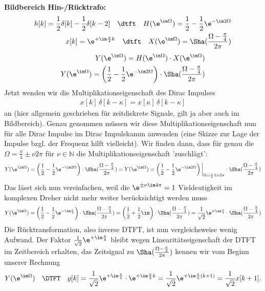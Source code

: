 \begin{ExCalc}
\textbf{Bildbereich Hin-/Rücktrafo:}
\begin{align}
h[k] = \frac{1}{2}\delta[k] - \frac{1}{2}\delta[k-2]\quad\dtft\quad
H(\e^{\im\Omega}) = \frac{1}{2} - \frac{1}{2} \e^{-\im 2 \Omega}\\
x[k]=\e^{+\im \frac{\pi}{4} k} \quad\dtft\quad
X(\e^{\im\Omega}) = \Sha(\frac{\Omega-\frac{\pi}{4}}{2\pi})
\end{align}
%
\begin{align}
Y(\e^{\im\Omega}) = H(\e^{\im\Omega}) \cdot X(\e^{\im\Omega})\\
Y(\e^{\im\Omega}) = \left(\frac{1}{2} - \frac{1}{2} \e^{-\im 2 \Omega}\right)
\cdot
\Sha(\frac{\Omega-\frac{\pi}{4}}{2\pi})
\end{align}
%
Jetzt wenden wir die Multiplikationseigenschaft des Dirac Impulses
\begin{align}
x[k] \, \delta[k-\kappa] = x[\kappa] \, \delta[k-\kappa]
\end{align}
an (hier allgemein geschrieben für zeitdiskrete Signale, gilt ja aber auch im
Bildbereich).
%
Genau genommen müssen wir diese Multiplikationseigenschaft nun für alle Dirac Impulse
im Dirac Impulskamm anwenden (eine Skizze zur Lage der Impulse bzgl. der Frequenz
hilft vielleicht).
%
Wir finden dann, dass für genau die $\Omega=\frac{\pi}{4}\pm\nu 2\pi$ für $\nu\in\mathbb{N}$
die Multiplikationseigenschaft 'zuschlägt':
\begin{align}
Y(\e^{\im\Omega}) = \left(\frac{1}{2} - \frac{1}{2} \e^{-\im 2 \Omega}\right)
\cdot
\Sha(\frac{\Omega-\frac{\pi}{4}}{2\pi})
=
Y(\e^{\im\Omega}) = \left(\frac{1}{2} - \frac{1}{2} \e^{-\im 2 \Omega}\right)\bigg|_{\Omega=\frac{\pi}{4}\pm\nu 2\pi}
\cdot
\Sha(\frac{\Omega-\frac{\pi}{4}}{2\pi})
\end{align}
Das lässt sich nun vereinfachen, weil die $\e^{\pm \nu \im 4 \pi}=1$ Vieldeutigkeit
im komplexen Dreher nicht mehr weiter berücksichtigt werden muss
\begin{align}
Y(\e^{\im\Omega}) = \left(\frac{1}{2} - \frac{1}{2} \e^{-\im \frac{\pi}{2}}\right)
\cdot
\Sha(\frac{\Omega-\frac{\pi}{4}}{2\pi}) =
\left(\frac{1}{2} + \frac{1}{2} \im \right)
\cdot
\Sha(\frac{\Omega-\frac{\pi}{4}}{2\pi}) =
\frac{1}{\sqrt{2}} \e^{+\im\frac{\pi}{4}}\cdot\Sha(\frac{\Omega-\frac{\pi}{4}}{2\pi})
\end{align}
Die Rücktransformation, also inverse DTFT, ist nun vergleichsweise wenig Aufwand.
%
Der Faktor $\frac{1}{\sqrt{2}} \e^{+\im\frac{\pi}{4}}$ bleibt wegen Linearitätseigenschaft
der DTFT im Zeitbereich erhalten, das Zeitsignal zu $\Sha(\frac{\Omega-\frac{\pi}{4}}{2\pi})$
kennen wir vom Beginn unserer Rechnung
\begin{align}
Y(\e^{\im\Omega}) \quad\DTFT\quad y[k] = \frac{1}{\sqrt{2}} \e^{+\im\frac{\pi}{4}} \cdot \e^{+\im \frac{\pi}{4} k}=
\frac{1}{\sqrt{2}} \e^{+\im \frac{\pi}{4} (k+1)} = \frac{1}{\sqrt{2}} x[k+1].
\end{align}


\end{ExCalc}
